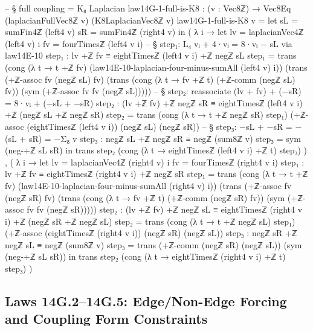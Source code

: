 \documentclass[11pt,a4paper]{book}
\begin{document}
\begin{code}
-- § full coupling = K₈ Laplacian
law14G-1-full-is-K8 : (v : Vec8ℤ) → Vec8Eq (laplacianFullVec8ℤ v) (K8LaplacianVec8ℤ v)
law14G-1-full-is-K8 v =
  let sL = sumFin4ℤ (left4 v)
      sR = sumFin4ℤ (right4 v)
  in
  ( λ i →
      let lv = laplacianVec4ℤ (left4 v) i
          fv = fourTimesℤ (left4 v i)
          -- § step₁: L₄ vᵢ + 4·vᵢ = 8·vᵢ − sL via law14E-10
          step₁ : lv +ℤ fv ≡ eightTimesℤ (left4 v i) +ℤ negℤ sL
          step₁ =
            trans
              (cong (λ t → t +ℤ fv) (law14E-10-laplacian-four-minus-sumAll (left4 v) i))
              (trans
                (+ℤ-assoc fv (negℤ sL) fv)
                (trans
                  (cong (λ t → fv +ℤ t) (+ℤ-comm (negℤ sL) fv))
                  (sym (+ℤ-assoc fv fv (negℤ sL)))))
          -- § step₂: reassociate (lv + fv) + (−sR) = 8·vᵢ + (−sL + −sR)
          step₂ : (lv +ℤ fv) +ℤ negℤ sR ≡ eightTimesℤ (left4 v i) +ℤ (negℤ sL +ℤ negℤ sR)
          step₂ =
            trans
              (cong (λ t → t +ℤ negℤ sR) step₁)
              (+ℤ-assoc (eightTimesℤ (left4 v i)) (negℤ sL) (negℤ sR))
          -- § step₃: −sL + −sR = −(sL + sR) = −Σ₈ v
          step₃ : negℤ sL +ℤ negℤ sR ≡ negℤ (sum8ℤ v)
          step₃ = sym (neg-+ℤ sL sR)
      in
      trans step₂ (cong (λ t → eightTimesℤ (left4 v i) +ℤ t) step₃)
  ) ,
  ( λ i →
      let lv = laplacianVec4ℤ (right4 v) i
          fv = fourTimesℤ (right4 v i)
          step₁ : lv +ℤ fv ≡ eightTimesℤ (right4 v i) +ℤ negℤ sR
          step₁ =
            trans
              (cong (λ t → t +ℤ fv) (law14E-10-laplacian-four-minus-sumAll (right4 v) i))
              (trans
                (+ℤ-assoc fv (negℤ sR) fv)
                (trans
                  (cong (λ t → fv +ℤ t) (+ℤ-comm (negℤ sR) fv))
                  (sym (+ℤ-assoc fv fv (negℤ sR)))))
          step₂ : (lv +ℤ fv) +ℤ negℤ sL ≡ eightTimesℤ (right4 v i) +ℤ (negℤ sR +ℤ negℤ sL)
          step₂ =
            trans
              (cong (λ t → t +ℤ negℤ sL) step₁)
              (+ℤ-assoc (eightTimesℤ (right4 v i)) (negℤ sR) (negℤ sL))
          step₃ : negℤ sR +ℤ negℤ sL ≡ negℤ (sum8ℤ v)
          step₃ =
            trans
              (+ℤ-comm (negℤ sR) (negℤ sL))
              (sym (neg-+ℤ sL sR))
      in
      trans step₂ (cong (λ t → eightTimesℤ (right4 v i) +ℤ t) step₃)
  )
\end{code}

\subsection{Laws 14G.2--14G.5: Edge/Non-Edge Forcing and Coupling Form Constraints}
\end{document}
